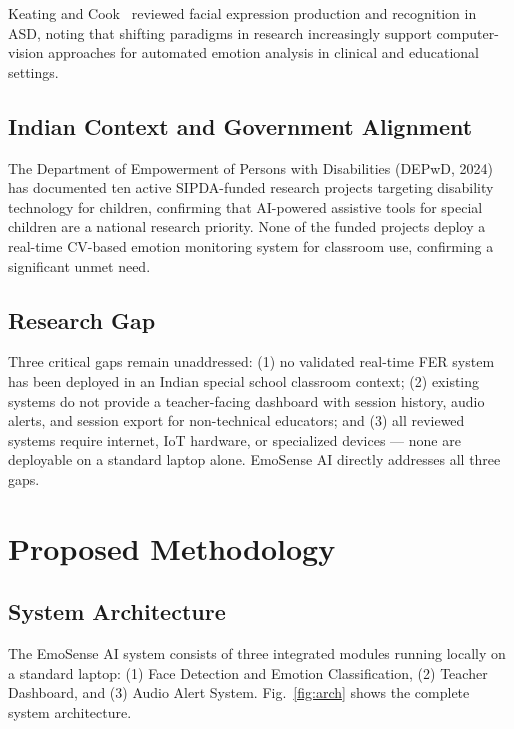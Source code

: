 \documentclass[conference]{IEEEtran}
\begin{document}
Keating and Cook~\cite{keating2020} reviewed facial
expression production and recognition in ASD, noting that
shifting paradigms in research increasingly support
computer-vision approaches for automated emotion analysis
in clinical and educational settings.

\subsection{Indian Context and Government Alignment}

The Department of Empowerment of Persons with Disabilities
(DEPwD, 2024)~\cite{depwd2024} has documented ten active
SIPDA-funded research projects targeting disability
technology for children, confirming that AI-powered
assistive tools for special children are a national
research priority. None of the funded projects deploy
a real-time CV-based emotion monitoring system for
classroom use, confirming a significant unmet need.

\subsection{Research Gap}

Three critical gaps remain unaddressed: (1) no validated
real-time FER system has been deployed in an Indian special
school classroom context; (2) existing systems do not provide
a teacher-facing dashboard with session history, audio alerts,
and session export for non-technical educators; and
(3) all reviewed systems require internet, IoT hardware, or
specialized devices --- none are deployable on a standard
laptop alone. EmoSense AI directly addresses all three gaps.

\section{Proposed Methodology}

\subsection{System Architecture}

The EmoSense AI system consists of three integrated modules
running locally on a standard laptop: (1) Face Detection and
Emotion Classification, (2) Teacher Dashboard, and
(3) Audio Alert System. Fig.~\ref{fig:arch} shows the
complete system architecture.
\end{document}
